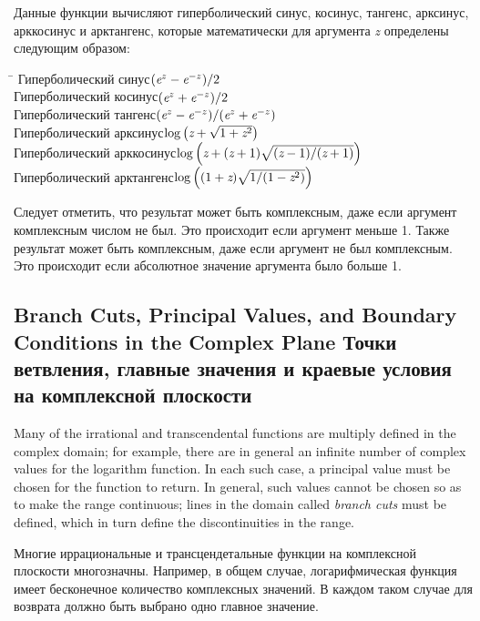 \begin{defun}[Function]
Данные функции вычисляют гиперболический синус, косинус, тангенс, арксинус,
арккосинус и арктангенс, которые математически для аргумента \emph{z} определены
следующим образом:
\begin{tabbing}
\hskip 10pc\=\kill
Гиперболический синус\>$ (\emph{e}^{z}-\emph{e}^{-z})/2 $ \\
Гиперболический косинус\>$ (\emph{e}^{z}+\emph{e}^{-z})/2 $ \\
Гиперболический тангенс\>$ (\emph{e}^{z}-\emph{e}^{-z})/(\emph{e}^{z}+\emph{e}^{-z}) $ \\[2pt]
Гиперболический арксинус\>$ \log \left(\emph{z}+\sqrt{1+\emph{z}^2}\right) $ \\[2pt]
Гиперболический арккосинус\>$ \log
\left(\emph{z}+(\emph{z}+1)\sqrt{(\emph{z}-1)/(\emph{z}+1)}\right) $ \\[2pt]
Гиперболический арктангенс\>$ \log \left((1+\emph{z})\sqrt{1/(1-\emph{z}^2)}\right) $
\end{tabbing}

Следует отметить, что результат  может быть комплексным, даже если
аргумент комплексным числом не был. Это происходит если аргумент меньше 1.
Также результат  может быть комплексным, даже если аргумент не был
комплексным. Это происходит если абсолютное значение аргумента было больше 1.
\end{defun}

\subsection{Branch Cuts, Principal Values, and Boundary Conditions in the
  Complex Plane Точки ветвления, главные значения и краевые условия на комплексной плоскости}
\label{BRANCH-CUTS-SECTION}


Many of the irrational and transcendental functions are multiply defined
in the complex domain; for example, there are in general an infinite
number of complex values for the logarithm function.  In each such
case, a principal value must be chosen for the function to return.
In general, such values cannot be chosen so as to make the range
continuous; lines in the domain
called \emph{branch cuts} must be defined, which in turn
define the discontinuities in the range.

Многие иррациональные и трансцендетальные функции на комплексной
плоскости многозначны. Например, в общем случае, логарифмическая функция имеет
бесконечное количество комплексных значений. В каждом таком случае для возврата
должно быть выбрано одно главное значение. 

